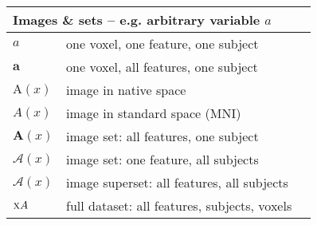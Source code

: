 \begin{singlespacing}
\begin{table}[H]
\begin{tabular}{lll}
  	\multicolumn{3}{l}{Images \& sets -- e.g. arbitrary variable $a$}                                                        \\ \hline
  	$a$                   & one voxel, one feature, one subject                                        &                     \\
  	$\bm{a}$              & one voxel, all features, one subject                                       &                     \\
  	$\mathrm{A}(x)$       & image in native space                                                      &                     \\
  	$A(x)$                & image in standard space (MNI)                                              &                     \\
  	$\bm{A}(x)$           & image set: all features, one subject                                       &                     \\
  	$\mathcal{A}(x)$      & image set: one feature, all subjects                                       &                     \\
  	$\bm{\mathcal{A}}(x)$ & image superset: all features, all subjects                                 &                     \\
  	$\textsc{x}{A}$               & full dataset: all features, subjects, voxels                               &                     \\ \hline
  \end{tabular}
\end{table}
\end{singlespacing}
\clearpage
{}
\setcounter{page}{1}
